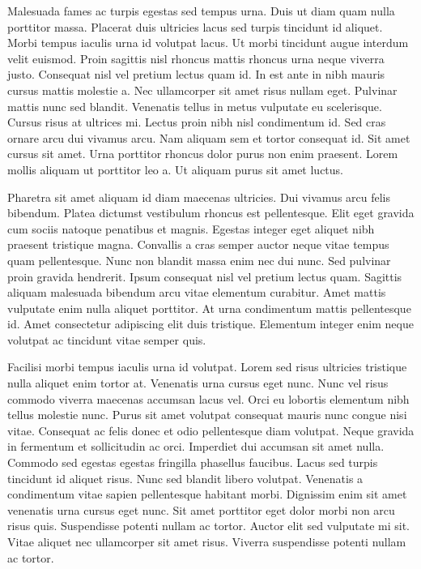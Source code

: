 \documentclass[11pt,a4paper]{article}
\begin{document}
Malesuada fames ac turpis egestas sed tempus urna. Duis ut diam quam nulla porttitor massa. Placerat duis ultricies lacus sed turpis tincidunt id aliquet. Morbi tempus iaculis urna id volutpat lacus. Ut morbi tincidunt augue interdum velit euismod. Proin sagittis nisl rhoncus mattis rhoncus urna neque viverra justo. Consequat nisl vel pretium lectus quam id. In est ante in nibh mauris cursus mattis molestie a. Nec ullamcorper sit amet risus nullam eget. Pulvinar mattis nunc sed blandit. Venenatis tellus in metus vulputate eu scelerisque. Cursus risus at ultrices mi. Lectus proin nibh nisl condimentum id. Sed cras ornare arcu dui vivamus arcu. Nam aliquam sem et tortor consequat id. Sit amet cursus sit amet. Urna porttitor rhoncus dolor purus non enim praesent. Lorem mollis aliquam ut porttitor leo a. Ut aliquam purus sit amet luctus.

Pharetra sit amet aliquam id diam maecenas ultricies. Dui vivamus arcu felis bibendum. Platea dictumst vestibulum rhoncus est pellentesque. Elit eget gravida cum sociis natoque penatibus et magnis. Egestas integer eget aliquet nibh praesent tristique magna. Convallis a cras semper auctor neque vitae tempus quam pellentesque. Nunc non blandit massa enim nec dui nunc. Sed pulvinar proin gravida hendrerit. Ipsum consequat nisl vel pretium lectus quam. Sagittis aliquam malesuada bibendum arcu vitae elementum curabitur. Amet mattis vulputate enim nulla aliquet porttitor. At urna condimentum mattis pellentesque id. Amet consectetur adipiscing elit duis tristique. Elementum integer enim neque volutpat ac tincidunt vitae semper quis.

Facilisi morbi tempus iaculis urna id volutpat. Lorem sed risus ultricies tristique nulla aliquet enim tortor at. Venenatis urna cursus eget nunc. Nunc vel risus commodo viverra maecenas accumsan lacus vel. Orci eu lobortis elementum nibh tellus molestie nunc. Purus sit amet volutpat consequat mauris nunc congue nisi vitae. Consequat ac felis donec et odio pellentesque diam volutpat. Neque gravida in fermentum et sollicitudin ac orci. Imperdiet dui accumsan sit amet nulla. Commodo sed egestas egestas fringilla phasellus faucibus. Lacus sed turpis tincidunt id aliquet risus. Nunc sed blandit libero volutpat. Venenatis a condimentum vitae sapien pellentesque habitant morbi. Dignissim enim sit amet venenatis urna cursus eget nunc. Sit amet porttitor eget dolor morbi non arcu risus quis. Suspendisse potenti nullam ac tortor. Auctor elit sed vulputate mi sit. Vitae aliquet nec ullamcorper sit amet risus. Viverra suspendisse potenti nullam ac tortor.
\end{document}
